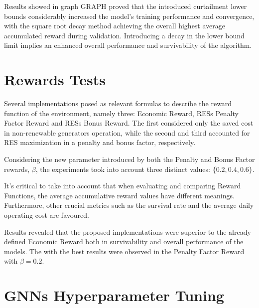 Results showed in graph GRAPH proved that the introduced curtailment lower bounds considerably increased the model's training performance and convergence, with the square root decay method achieving the overall highest average accumulated reward during validation. Introducing a decay in the lower bound limit implies an enhanced overall performance and survivability of the algorithm.

\section{Rewards Tests} \label{sec:rewards}

Several implementations posed as relevant formulas to describe the reward function of the environment, namely three: Economic Reward, \acp{RES} Penalty Factor Reward and \acp{RES} Bonus Reward. The first considered only the saved cost in non-renewable generators operation, while the second and third accounted for \ac{RES} maximization in a penalty and bonus factor, respectively.
\par

Considering the new parameter introduced by both the Penalty and Bonus Factor rewards, $\beta$, the experiments took into account three distinct values: $\{0.2, 0.4, 0.6\}$.


\par

It's critical to take into account that when evaluating and comparing Reward Functions, the average accumulative reward values have different meanings. Furthermore, other crucial metrics such as the survival rate and the average daily operating cost are favoured.
\par
Results revealed that the proposed implementations were superior to the already defined Economic Reward both in survivability and overall performance of the models. The with the best results were observed in the Penalty Factor Reward with $\beta = 0.2$.

\section{\acp{GNN} Hyperparameter Tuning} \label{sec:gnn-hypertune}

